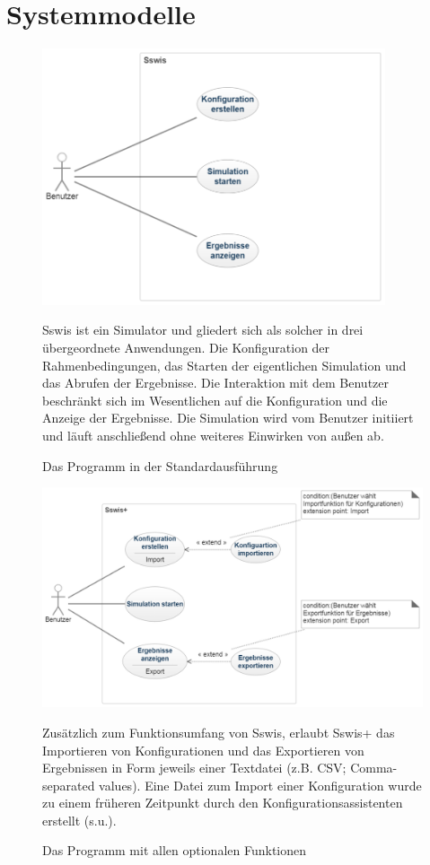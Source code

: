 \section{Systemmodelle}
\begin{figure}[htbp]
{\centering 
\includegraphics[width=0.9\textwidth]{Anwendungsfalldiagramme/usecase_sswis.png}
\caption{Das Programm in der Standardausführung} }
\bigskip
Sswis ist ein Simulator und gliedert sich als solcher in drei übergeordnete Anwendungen. Die Konfiguration der Rahmenbedingungen, das Starten der eigentlichen Simulation und das Abrufen der Ergebnisse. Die Interaktion mit dem Benutzer beschränkt sich im Wesentlichen auf die Konfiguration und die Anzeige der Ergebnisse. Die Simulation wird vom Benutzer initiiert und läuft anschließend ohne weiteres Einwirken von außen ab.

\end{figure}
\begin{figure}[htbp]
{\centering
\includegraphics[width=1.1\textwidth]{Anwendungsfalldiagramme/usecase_sswis+.png}
\caption{Das Programm mit allen optionalen Funktionen} }
\bigskip

Zusätzlich zum Funktionsumfang von Sswis, erlaubt Sswis+ das Importieren von Konfigurationen und das Exportieren von Ergebnissen in Form jeweils einer Textdatei (z.B. CSV; Comma-separated values). Eine Datei zum Import einer Konfiguration wurde zu einem früheren Zeitpunkt durch den Konfigurationsassistenten erstellt (s.u.).

\end{figure}